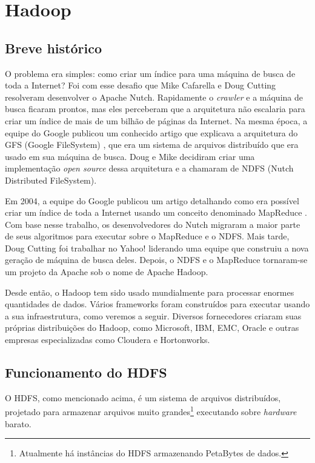 \section{Hadoop}
\subsection{Breve histórico}
O problema era simples: como criar um índice para uma máquina de busca de toda a Internet? Foi com esse desafio que Mike Cafarella e Doug Cutting resolveram desenvolver o Apache Nutch. Rapidamente o \textit{crawler} e a máquina de busca ficaram prontos, mas eles perceberam que a arquitetura não escalaria para criar um índice de mais de um bilhão de páginas da Internet. Na mesma época, a equipe do Google publicou um conhecido artigo que explicava a arquitetura do GFS (Google FileSystem) \cite{ghemawat2003google}, que era um sistema de arquivos distribuído que era usado em sua máquina de busca. Doug e Mike decidiram criar uma implementação \textit{open source} dessa arquitetura e a chamaram de NDFS (Nutch Distributed FileSystem).

Em 2004, a equipe do Google publicou um artigo detalhando como era possível criar um índice de toda a Internet usando um conceito denominado MapReduce \cite{dean2008mapreduce}. Com base nesse trabalho, os desenvolvedores do Nutch migraram a maior parte de seus algoritmos para executar sobre o MapReduce e o NDFS. Mais tarde, Doug Cutting foi trabalhar no Yahoo! liderando uma equipe que construiu a nova geração de máquina de busca deles. Depois, o NDFS e o MapReduce tornaram-se um projeto da Apache sob o nome de Apache Hadoop.

Desde então, o Hadoop tem sido usado mundialmente para processar enormes quantidades de dados. Vários frameworks foram construídos para executar usando a sua infraestrutura, como veremos a seguir. Diversos fornecedores criaram suas próprias distribuições do Hadoop, como Microsoft, IBM, EMC, Oracle e outras empresas especializadas como Cloudera e Hortonworks.

\subsection{Funcionamento do HDFS}
O HDFS, como mencionado acima, é um sistema de arquivos distribuídos, projetado para armazenar arquivos muito grandes\footnote{Atualmente há instâncias do HDFS armazenando PetaBytes de dados.} executando sobre \textit{hardware} barato. 

